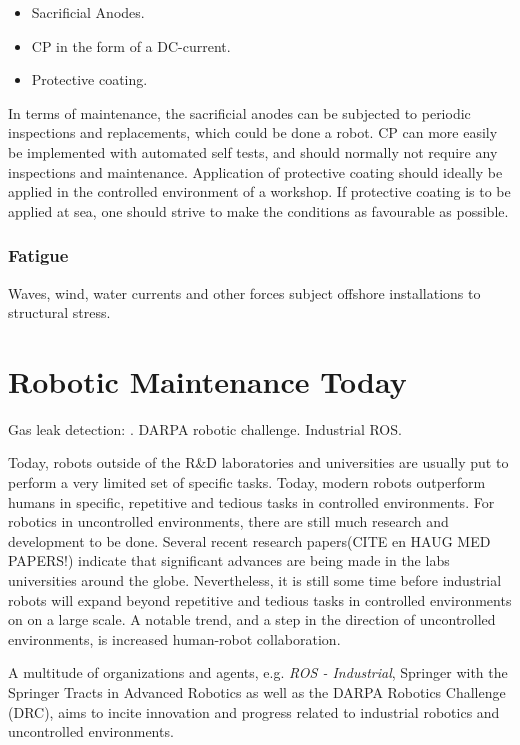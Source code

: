 \begin{itemize}
	\item Sacrificial Anodes.
	\item \ac{CP} in the form of a DC-current.
	\item Protective coating.
\end{itemize} 

In terms of maintenance, the sacrificial anodes can be subjected to periodic inspections and replacements, which could be done a robot. \ac{CP} can more easily be implemented with automated self tests, and should normally not require any inspections and maintenance\cite{ElReedy2012383}. Application of protective coating should ideally be applied in the controlled environment of a workshop. If protective coating is to be applied at sea, one should strive to make the conditions as favourable as possible.

\subsubsection{Fatigue}

Waves, wind, water currents and other forces subject offshore installations to structural stress.

\section{Robotic Maintenance Today}

Gas leak detection: \cite{FSR2014_gas_leak}. DARPA robotic challenge. Industrial ROS.

Today, robots outside of the R\&D laboratories and universities are usually put to perform a very limited set of specific tasks. Today, modern robots outperform humans in specific, repetitive and tedious tasks in controlled environments. For robotics in uncontrolled environments, there are still much research and development to be done. Several recent research papers(CITE en HAUG MED PAPERS!) indicate that significant advances are being made in the labs universities around the globe. Nevertheless, it is still some time before industrial robots will expand beyond repetitive and tedious tasks in controlled environments on on a large scale\cite{ifr_statistics}. A notable trend, and a step in the direction of uncontrolled environments, is increased human-robot collaboration\cite{cobotsEurope}.

A multitude of organizations and agents, e.g. \textit{ROS - Industrial}\cite{ROS_industrial}, Springer with the Springer Tracts in Advanced Robotics as well as the DARPA Robotics Challenge (DRC)\cite{DRC}, aims to incite innovation and progress related to industrial robotics and uncontrolled environments. 

